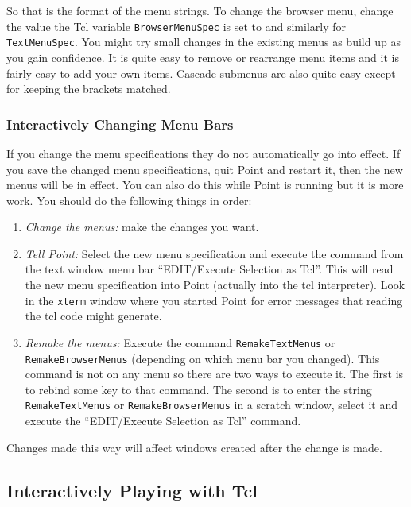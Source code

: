 So that is the format of the menu strings.
To change the browser menu, change the value the Tcl variable
{\tt BrowserMenuSpec} is set to and similarly for {\tt TextMenuSpec}.
You might try small changes in the existing menus as build up as you
gain confidence.
It is quite easy to remove or rearrange menu items
and it is fairly easy to add your own items.
Cascade submenus are also quite easy except for keeping
the brackets matched.

\subsubsection{ Interactively Changing Menu Bars }

If you change the menu specifications they do not automatically
go into effect.
If you save the changed menu specifications, quit Point and
restart it, then the new menus will be in effect.
You can also do this while Point is running but it is more work.
You should do the following things in order:

\begin{enumerate}

\item {\it Change the menus:}  make the changes you want.

\item {\it Tell Point:}  Select the new menu specification and
execute the command from the text window menu bar
``EDIT/Execute Selection as Tcl''.
This will read the new menu specification into Point
(actually into the tcl interpreter).
Look in the {\tt xterm} window where you started Point for error
messages that reading the tcl code might generate.

\item {\it Remake the menus:}  Execute the command {\tt RemakeTextMenus}
or {\tt RemakeBrowserMenus} (depending on which menu bar you changed).
This command is not on any menu so there are two ways to execute it.
The first is to rebind some key to that command.
The second is to enter the string {\tt RemakeTextMenus} or
{\tt RemakeBrowserMenus} in a scratch window, select it and
execute the ``EDIT/Execute Selection as Tcl'' command.

\end{enumerate}

Changes made this way will affect windows created after the
change is made.


\subsection{ Interactively Playing with Tcl }

